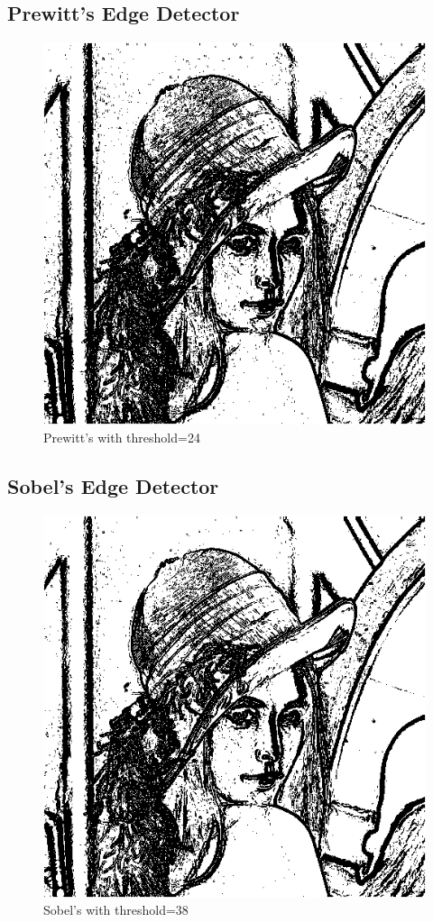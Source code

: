 \documentclass{article}
\begin{document}
\subsection{Prewitt's Edge Detector}
\begin{figure}[H]
  \includegraphics[width=\linewidth]{img/prewitt_24.png}
  \caption{Prewitt's with threshold=24}
  \label{fig:prewitt_24}
\end{figure}

\subsection{Sobel's Edge Detector}
\begin{figure}[H]
  \includegraphics[width=\linewidth]{img/sobel_38.png}
  \caption{Sobel's with threshold=38}
  \label{fig:sobel_38}
\end{figure}
\end{document}

